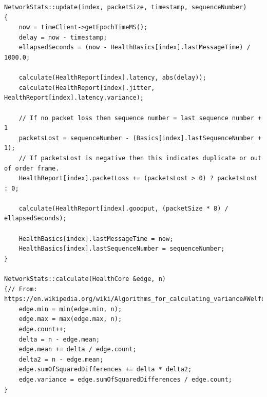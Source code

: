 \documentclass[letterpaper,twocolumn,10pt]{article}
\begin{document}

\begin{verbatim}
NetworkStats::update(index, packetSize, timestamp, sequenceNumber)
{
    now = timeClient->getEpochTimeMS();
    delay = now - timestamp;
    ellapsedSeconds = (now - HealthBasics[index].lastMessageTime) / 1000.0;

    calculate(HealthReport[index].latency, abs(delay));
    calculate(HealthReport[index].jitter, HealthReport[index].latency.variance);

    // If no packet loss then sequence number = last sequence number + 1
    packetsLost = sequenceNumber - (Basics[index].lastSequenceNumber + 1);
    // If packetsLost is negative then this indicates duplicate or out of order frame.
    HealthReport[index].packetLoss += (packetsLost > 0) ? packetsLost : 0;

    calculate(HealthReport[index].goodput, (packetSize * 8) / ellapsedSeconds);
    
    HealthBasics[index].lastMessageTime = now;
    HealthBasics[index].lastSequenceNumber = sequenceNumber;
}

NetworkStats::calculate(HealthCore &edge, n)
{// From: https://en.wikipedia.org/wiki/Algorithms_for_calculating_variance#Welford's_online_algorithm
    edge.min = min(edge.min, n);
    edge.max = max(edge.max, n);
    edge.count++;
    delta = n - edge.mean;
    edge.mean += delta / edge.count;
    delta2 = n - edge.mean;
    edge.sumOfSquaredDifferences += delta * delta2;
    edge.variance = edge.sumOfSquaredDifferences / edge.count;
}
\end{verbatim}
\end{document}
